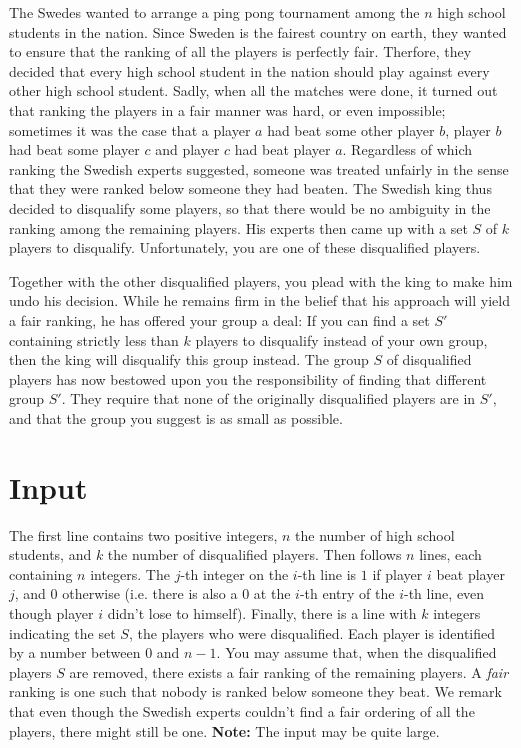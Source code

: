 
\noindent
The Swedes wanted to arrange a ping pong tournament among the $n$ high school students in the nation. Since Sweden is the fairest country on earth, they wanted to ensure that the ranking of all the players is perfectly fair. Therfore, they decided that every high school student in the nation should play against every other high school student. Sadly, when all the matches were done, it turned out that ranking the players in a fair manner was hard, or even impossible; sometimes it was the case that a player $a$ had beat some other player $b$, player $b$ had beat some player $c$ and player $c$ had beat player $a$. Regardless of which ranking the Swedish experts suggested, someone was treated unfairly in the sense that they were ranked below someone they had beaten. The Swedish king thus decided to disqualify some players, so that there would be no ambiguity in the ranking among the remaining players. His experts then came up with a set $S$ of $k$ players to disqualify. Unfortunately, you are one of these disqualified players. 

Together with the other disqualified players, you plead with the king to make him undo his decision. While he remains firm in the belief that his approach will yield a fair ranking, he has offered your group a deal: If you can find a set $S'$ containing strictly less than $k$ players to disqualify instead of your own group, then the king will disqualify this group instead. The group $S$ of disqualified players has now bestowed upon you the responsibility of finding that different group $S'$. They require that none of the originally disqualified players are in $S'$, and that the group you suggest is as small as possible.

\section*{Input}
The first line contains two positive integers, $n$ the number of high school students, and $k$ the number of disqualified players. Then follows $n$ lines, each containing $n$ integers. The $j$-th integer on the $i$-th line is $1$ if player $i$ beat player $j$, and $0$ otherwise (i.e. there is also a $0$ at the $i$-th entry of the $i$-th line, even though player $i$ didn't lose to himself). Finally, there is a line with $k$ integers indicating the set $S$, the players who were disqualified. Each player is identified by a number between $0$ and $n-1$. You may assume that, when the disqualified players $S$ are removed, there exists a fair ranking of the remaining players. A \emph{fair} ranking is one such that nobody is ranked below someone they beat. We remark that even though the Swedish experts couldn't find a fair ordering of all the players, there might still be one. \textbf{Note:} The input may be quite large.

